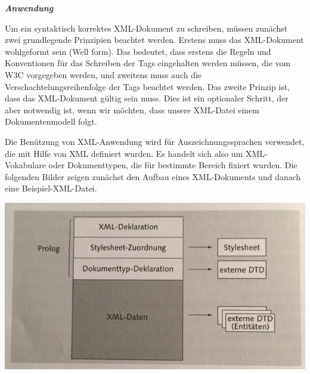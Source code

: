 \textit{\textbf{Anwendung}}

Um ein syntaktisch korrektes XML-Dokument zu schreiben, müssen zunächst zwei grundlegende Prinzipien beachtet werden. Erstens muss das XML-Dokument wohlgeformt sein (Well form). Das bedeutet, dass erstens die Regeln und Konventionen für das Schreiben der Tags eingehalten werden müssen, die vom W3C vorgegeben werden, und zweitens muss auch die Verschachtelungsreihenfolge der Tags beachtet werden. Das zweite Prinzip ist, dass das XML-Dokument gültig sein muss. Dies ist ein optionaler Schritt, der aber notwendig ist, wenn wir möchten, dass unsere XML-Datei einem Dokumentenmodell folgt.

Die Benützung von XML-Anwendung wird für Auszeichnungssprachen verwendet, die mit Hilfe von XML definiert wurden. Es handelt sich also um XML-Vokabulare oder Dokumenttypen, die für bestimmte Bereich fixiert wurden.\cite{helmut36}
Die folgenden Bilder zeigen zunächst den Aufbau eines XML-Dokuments und danach eine Beispiel-XML-Datei.

\begin{center}
\includegraphics[scale=.5]{images/Aufbauschema_eines_XML-Dockuments} \cite{helmut_img_xml}
\end{center}

